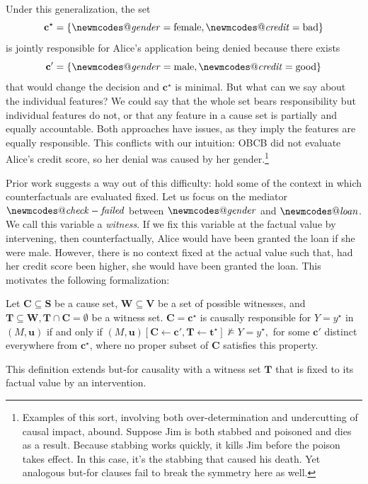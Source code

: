 \documentclass[anon,12pt]{clear2026} %
\makeatletter
\DeclareRobustCommand{\varname}[1]{\begingroup\newmcodes@\mathit{#1}\endgroup}
\makeatother
\begin{document}
Under this generalization, the set \[\mathbf{c}^\star = \{\varname{gender}=\text{female}, \varname{credit}=\text{bad}\}\] is jointly responsible for Alice's application being denied because there exists \[\mathbf{c}' = \{\varname{gender}=\text{male}, \varname{credit}=\text{good}\}\] that would change the decision and $\mathbf{c}^\star$ is minimal.
But what can we say about the individual features? 
We could say that the whole set bears responsibility but individual features do not, or that any feature in a cause set is partially and equally accountable.
Both approaches have issues, as they imply the features are equally responsible.
This conflicts with our intuition: OBCB did not evaluate Alice’s credit score, so her denial was caused by her gender.\footnote{
Examples of this sort, involving both over-determination and undercutting of causal impact, abound. 
Suppose Jim is both stabbed and poisoned and dies as a result. 
Because stabbing works quickly, it kills Jim before the poison takes effect. 
In this case, it’s the stabbing that caused his death. 
Yet analogous but-for clauses fail to break the symmetry here as well.
}

Prior work suggests a way out of this difficulty: hold some of the context in which counterfactuals are evaluated fixed.
Let us focus on the mediator $\varname{check-failed}$ between $\varname{gender}$ and $\varname{loan}$.
We call this variable a \emph{witness}.
If we fix this variable at the factual value by intervening, then counterfactually, Alice would have been granted the loan if she were male.
However, there is no context fixed at the actual value such that, had her credit score been higher, she would have been granted the loan.
This motivates the following formalization:
\begin{definition} 
Let $\mathbf{C} \subseteq \mathbf{S}$ be a cause set,
$\mathbf{W} \subseteq \mathbf{V}$ be a set of possible witnesses,
and $\mathbf{T} \subseteq \mathbf{W}, \mathbf{T} \cap \mathbf{C} = \emptyset$ be a witness set.
$\mathbf{C} = \mathbf{c}^\star$ is causally responsible for $Y = y^\star$ in $(M, \mathbf{u})$ if and only if $(M, \mathbf{u})[\mathbf{C} \leftarrow \mathbf{c}', \mathbf{T} \leftarrow \mathbf{t}^\star] \not\models Y = y^\star,$ for some \(\mathbf{c}'\) distinct everywhere from  \(\mathbf{c}^\star\), where no proper subset of \(\mathbf{C}\) satisfies this property.
\end{definition}

\noindent This definition extends but-for causality with a witness set $\mathbf{T}$ that is fixed to its factual value by an intervention.
\end{document}
